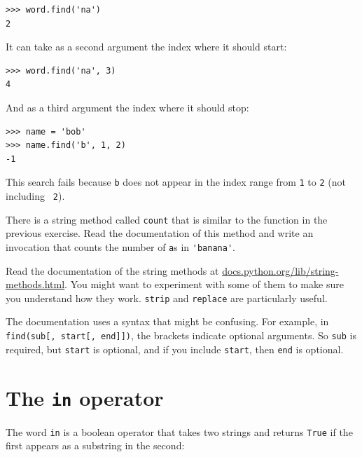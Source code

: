 \documentclass[10pt]{book}
\begin{document}
\begin{CJK}{UTF8}{gbsn}
\begin{verbatim}
>>> word.find('na')
2
\end{verbatim}
%
It can take as a second argument the index where it should start:

\begin{verbatim}
>>> word.find('na', 3)
4
\end{verbatim}
%
And as a third argument the index where it should stop:

\begin{verbatim}
>>> name = 'bob'
>>> name.find('b', 1, 2)
-1
\end{verbatim}
%
This search fails because {\tt b} does not
appear in the index range from {\tt 1} to {\tt 2} (not including {\tt
2}).


\begin{exercise}

There is a string method called {\tt count} that is similar
to the function in the previous exercise.  Read the documentation
of this method
and write an invocation that counts the number of {\tt a}s
in \verb"'banana'".
\end{exercise}


\begin{exercise}

Read the documentation of the string methods at
\url{docs.python.org/lib/string-methods.html}.  You
might want to experiment with some of them to make sure
you understand how they work.  {\tt strip} and
{\tt replace} are particularly useful.

The documentation uses a syntax that might be confusing.
For example, in \verb"find(sub[, start[, end]])", the brackets
indicate optional arguments.  So {\tt sub} is required, but
{\tt start} is optional, and if you include {\tt start},
then {\tt end} is optional.
\end{exercise}


\section{The {\tt in} operator}
\label{inboth}

The word {\tt in} is a boolean operator that takes two strings and
returns {\tt True} if the first appears as a substring in the second:


\end{CJK}
\end{document}
